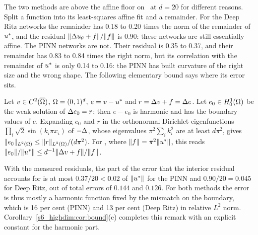 The two methods are above the affine floor on \Ptwo\ at $d=20$ for different reasons. Split a
function into its least-squares affine fit and a remainder. For the Deep Ritz networks the
remainder has 0.18 to 0.20 times the norm of the remainder of $u^{*}$, and the residual
$\lVert \Delta u_{\theta}+f\rVert/\lVert f\rVert$ is 0.90: these networks are still essentially affine. The PINN
networks are not. Their residual is 0.35 to 0.37, and their remainder has 0.83 to 0.84 times
the right norm, but its correlation with the remainder of $u^{*}$ is only 0.14 to 0.16: the
PINN has built curvature of the right size and the wrong shape. The following elementary
bound says where its error sits.

\begin{remark}\label{s6_highdim:rem:split}
Let $v\in C^2(\overline{\Omega})$, $\Omega=(0,1)^d$, $e=v-u^{*}$ and $r=\Delta v+f=\Delta e$. Let
$e_0\in H^1_0(\Omega)$ be the weak solution of $\Delta e_0=r$; then $e-e_0$ is harmonic and has
the boundary values of $e$. Expanding $e_0$ and $r$ in the orthonormal Dirichlet
eigenfunctions $\prod_{i}\sqrt2\sin(k_i\pi x_i)$ of $-\Delta$, whose eigenvalues
$\pi^2\sum_i k_i^2$ are at least $d\pi^2$, gives
$\lVert e_0\rVert_{L^2(\Omega)}\le\lVert r\rVert_{L^2(\Omega)}/(d\pi^2)$. For \Ptwo, where
$\lVert f\rVert=\pi^2\lVert u^{*}\rVert$, this reads
$\lVert e_0\rVert/\lVert u^{*}\rVert\le d^{-1}\lVert \Delta v+f\rVert/\lVert f\rVert$.
\end{remark}

\noindent
With the measured residuals, the part of the error that the interior residual accounts for is
at most $0.37/20<0.02$ of $\lVert u^{*}\rVert$ for the PINN and $0.90/20=0.045$ for Deep Ritz, out of
total errors of $0.144$ and $0.126$. For both methods the error is thus mostly a harmonic
function fixed by the mismatch on the boundary, which is 16 per cent (PINN) and 13 per cent
(Deep Ritz) in relative $L^2$ norm. Corollary~\ref{s6_highdim:cor:bound}(c) completes this
remark with an explicit constant for the harmonic part.

